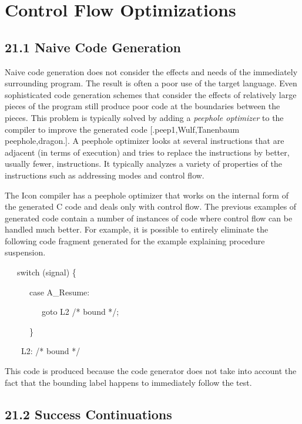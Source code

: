 \chapter{Control Flow Optimizations}

\section[21.1 Naive Code Generation]{21.1 Naive Code Generation}

Naive code generation does not consider the effects and needs of the
immediately surrounding program. The result is often a poor use of the
target language. Even sophisticated code generation schemes that
consider the effects of relatively large pieces of the program still
produce poor code at the boundaries between the pieces. This problem
is typically solved by adding a \textit{peephole optimizer} to the
compiler to improve the generated code [.peep1,Wulf,Tanenbaum
peephole,dragon.]. A peephole optimizer looks at several instructions
that are adjacent (in terms of execution) and tries to replace the
instructions by better, usually fewer, instructions. It typically
analyzes a variety of properties of the instructions such as
addressing modes and control flow.

The Icon compiler has a peephole optimizer that works on the internal
form of the generated C code and deals only with control flow. The
previous examples of generated code contain a number of instances of
code where control flow can be handled much better. For example, it is
possible to entirely eliminate the following code fragment generated
for the example explaining procedure suspension.

{\ttfamily\mdseries
\ \ \ switch (signal) \{}

{\ttfamily\mdseries
\ \ \ \ \ \ case A\_Resume:}

{\ttfamily\mdseries
\ \ \ \ \ \ \ \ \ goto L2 /* bound */;}

{\ttfamily\mdseries
\ \ \ \ \ \ \}}

{\ttfamily\mdseries
\ \ \ \ L2: /* bound */}


This code is produced because the code generator does not take into
account the fact that the bounding label happens to immediately follow
the test.


\section[21.2 Success Continuations]{21.2 Success Continuations}

